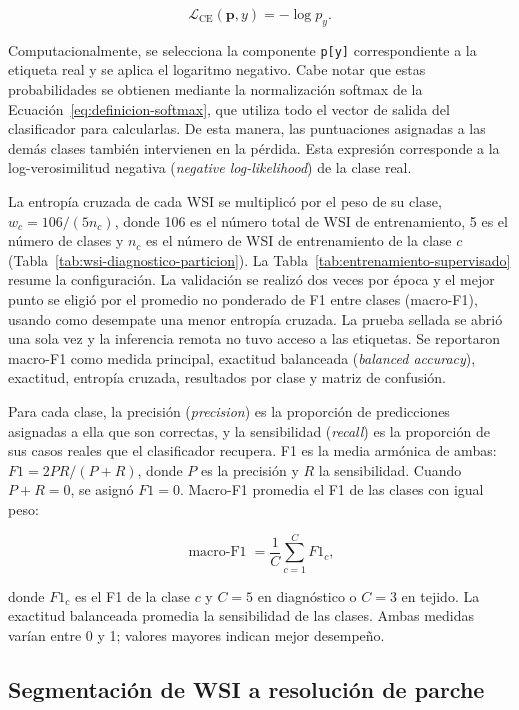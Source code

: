 \begin{equation}
    \mathcal{L}_{\mathrm{CE}}(\mathbf p,y)=-\log p_y.
    \label{eq:entropia-cruzada}
\end{equation}

Computacionalmente, se selecciona la componente \texttt{p[y]} correspondiente
a la etiqueta real y se aplica el logaritmo negativo. Cabe notar que estas
probabilidades se obtienen mediante la normalización softmax de la
Ecuación~\eqref{eq:definicion-softmax}, que utiliza todo el vector de salida
del clasificador para calcularlas. De esta manera, las puntuaciones asignadas
a las demás clases también intervienen en la pérdida. Esta expresión
corresponde a la log-verosimilitud negativa (\emph{negative log-likelihood})
de la clase real.

La entropía cruzada de cada WSI se multiplicó por el peso de su clase,
\(w_c=106/(5n_c)\), donde 106 es el número total de WSI de entrenamiento,
5 es el número de clases y \(n_c\) es el número de WSI de entrenamiento de
la clase \(c\) (Tabla~\ref{tab:wsi-diagnostico-particion}). La
Tabla~\ref{tab:entrenamiento-supervisado} resume la configuración.
La validación se realizó dos veces por época y el mejor punto se eligió por
el promedio no ponderado de F1 entre clases (macro-F1), usando como desempate
una menor entropía cruzada. La prueba sellada
se abrió una sola vez y la inferencia remota no tuvo acceso a las etiquetas.
Se reportaron macro-F1 como medida principal, exactitud balanceada (\emph{balanced accuracy}), exactitud,
entropía cruzada, resultados por clase y matriz de confusión.

Para cada clase, la precisión (\emph{precision}) es la proporción de predicciones asignadas a
ella que son correctas, y la sensibilidad (\emph{recall}) es la proporción de sus casos
reales que el clasificador recupera. F1 es la media armónica de ambas:
\(F1=2PR/(P+R)\), donde \(P\) es la precisión y \(R\) la sensibilidad.
Cuando \(P+R=0\), se asignó \(F1=0\).
Macro-F1 promedia el F1 de las clases con igual peso:

\[
\operatorname{macro-F1}=\frac{1}{C}\sum_{c=1}^{C}F1_c,
\]

donde \(F1_c\) es el F1 de la clase \(c\) y \(C=5\) en diagnóstico o \(C=3\) en tejido.
La exactitud balanceada promedia la
sensibilidad de las clases. Ambas medidas varían entre 0 y 1; valores mayores
indican mejor desempeño.

\subsection{Segmentación de WSI a resolución de parche}

